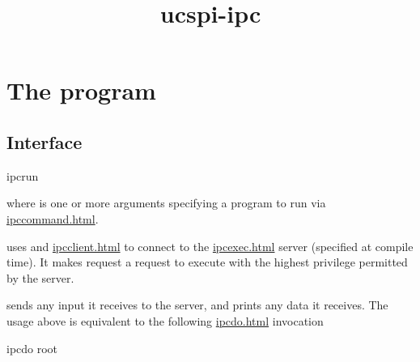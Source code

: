 \documentclass{book}
\title{ucspi-ipc}
\begin{document}
\section{The  program}

\subsection{Interface}
\begin{code}%
  ipcrun 
\end{code}
where  is one or more arguments specifying a program to run via
\href{\cmd{ipccommand}}{ipccommand.html}.

 uses  and \href{\cmd{ipcclient}}{ipcclient.html} to
connect to the \href{\cmd{ipcexec}}{ipcexec.html} server (specified at compile
time).  It makes request a request to execute  with the highest
privilege permitted by the server.

 sends any input it receives to the  server, and prints
any data it receives.  The usage above is equivalent to the following
\href{\cmd{ipcdo}}{ipcdo.html} invocation
\begin{code}%
  ipcdo root 
\end{code}
\end{document}
